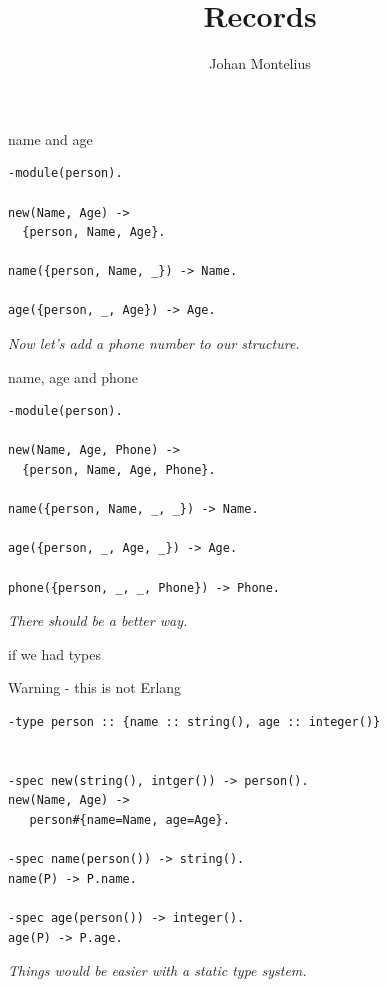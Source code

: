 

\title[ID1019 Records]{Records}


\author{Johan Montelius}
\date{\semester}



\begin{frame}
\titlepage
\end{frame}

\begin{frame}[fragile]{name and age}

\pause 
\begin{verbatim}
-module(person).

new(Name, Age) ->
  {person, Name, Age}.

name({person, Name, _}) -> Name.

age({person, _, Age}) -> Age.
\end{verbatim}

\pause\vspace{20pt}
{\em Now let's add a phone number to our structure.}

\end{frame} 

\begin{frame}[fragile]{name, age and phone}

\pause 
\begin{verbatim}
-module(person).

new(Name, Age, Phone) ->
  {person, Name, Age, Phone}.

name({person, Name, _, _}) -> Name.

age({person, _, Age, _}) -> Age.

phone({person, _, _, Phone}) -> Phone.
\end{verbatim}

\pause\vspace{20pt}
{\em There should be a better way.}

\end{frame} 

\begin{frame}[fragile]{if we had types}

Warning - this is not Erlang

\begin{verbatim}
-type person :: {name :: string(), age :: integer()}


-spec new(string(), intger()) -> person().
new(Name, Age) ->
   person#{name=Name, age=Age}.

-spec name(person()) -> string().
name(P) -> P.name.

-spec age(person()) -> integer().
age(P) -> P.age.
\end{verbatim}
\pause
{\em Things would be easier with a static type system.}

\end{frame}

